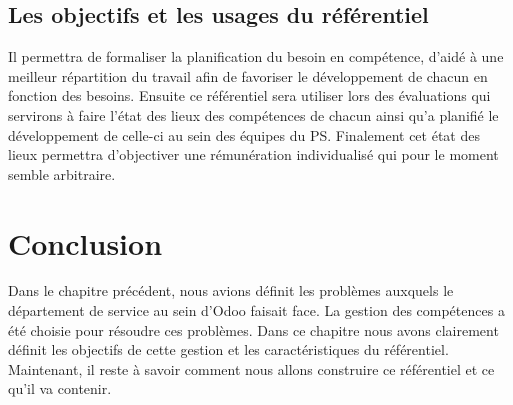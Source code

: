 \subsection{Les objectifs et les usages du référentiel}
Il permettra de formaliser la planification du besoin en compétence, d'aidé à une meilleur répartition du travail afin de favoriser le développement de chacun en fonction des besoins. Ensuite ce référentiel sera utiliser lors des évaluations qui servirons à faire l'état des lieux des compétences de chacun ainsi qu'a planifié le développement de celle-ci au sein des équipes du PS. Finalement cet état des lieux permettra d'objectiver une rémunération individualisé qui pour le moment semble arbitraire.



\section{Conclusion}
Dans le chapitre précédent, nous avions définit les problèmes auxquels le département de service au sein d'Odoo faisait face. La gestion des compétences a été choisie pour résoudre ces problèmes. Dans ce chapitre nous avons clairement définit les objectifs de cette gestion et les caractéristiques du référentiel. Maintenant, il reste à savoir comment nous allons construire ce référentiel et ce qu'il va contenir.
 










 

